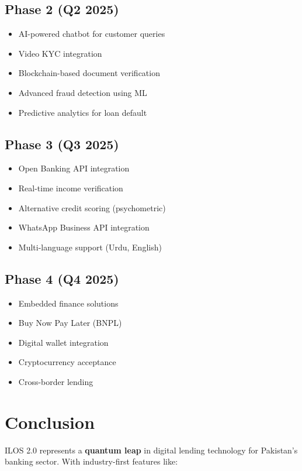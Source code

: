 \documentclass[12pt,a4paper]{article}
\begin{document}
\subsection{Phase 2 (Q2 2025)}
\begin{itemize}
    \item AI-powered chatbot for customer queries
    \item Video KYC integration
    \item Blockchain-based document verification
    \item Advanced fraud detection using ML
    \item Predictive analytics for loan default
\end{itemize}

\subsection{Phase 3 (Q3 2025)}
\begin{itemize}
    \item Open Banking API integration
    \item Real-time income verification
    \item Alternative credit scoring (psychometric)
    \item WhatsApp Business API integration
    \item Multi-language support (Urdu, English)
\end{itemize}

\subsection{Phase 4 (Q4 2025)}
\begin{itemize}
    \item Embedded finance solutions
    \item Buy Now Pay Later (BNPL)
    \item Digital wallet integration
    \item Cryptocurrency acceptance
    \item Cross-border lending
\end{itemize}

\newpage

\section*{Conclusion}

ILOS 2.0 represents a \textbf{quantum leap} in digital lending technology for Pakistan's banking sector. With industry-first features like:
\end{document}
